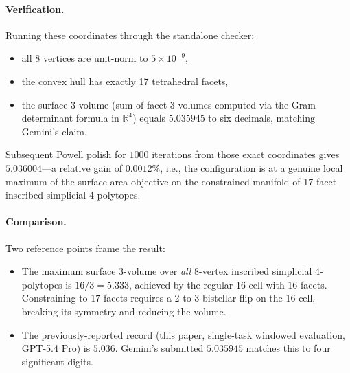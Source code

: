 \documentclass[11pt]{article}
\begin{document}
\paragraph{Verification.}
Running these coordinates through the standalone checker:
\begin{itemize}
\item all 8 vertices are unit-norm to $5 \times 10^{-9}$,
\item the convex hull has exactly 17 tetrahedral facets,
\item the surface 3-volume (sum of facet 3-volumes computed via
      the Gram-determinant formula in $\mathbb{R}^4$) equals
      $5.035945$ to six decimals, matching Gemini's claim.
\end{itemize}
Subsequent Powell polish for $1000$ iterations from those exact
coordinates gives $5.036004$---a relative gain of $0.0012\%$,
i.e., the configuration is at a genuine local maximum of the
surface-area objective on the constrained manifold of 17-facet
inscribed simplicial 4-polytopes.

\paragraph{Comparison.}
Two reference points frame the result:
\begin{itemize}
\item The maximum surface 3-volume over \emph{all} 8-vertex
      inscribed simplicial 4-polytopes is $16/3 = 5.333$, achieved
      by the regular 16-cell with $16$ facets.  Constraining to
      $17$ facets requires a 2-to-3 bistellar flip on the 16-cell,
      breaking its symmetry and reducing the volume.
\item The previously-reported record (this paper, single-task
      windowed evaluation, GPT-5.4 Pro) is $5.036$.  Gemini's
      submitted $5.035945$ matches this to four significant digits.
\end{itemize}
\end{document}
